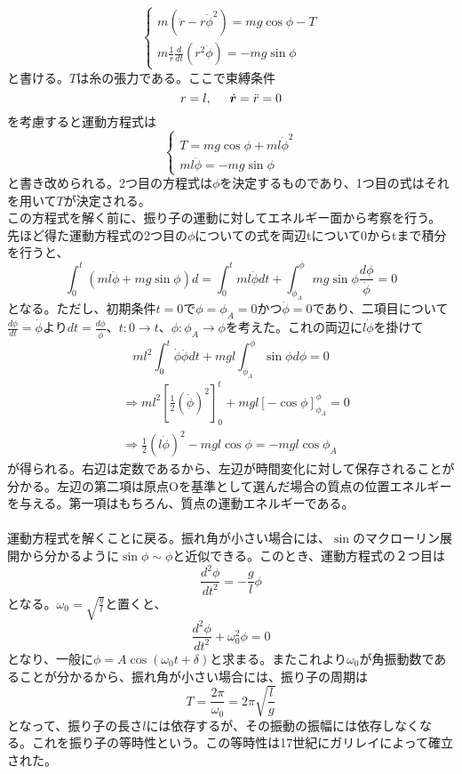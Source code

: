 \documentclass{jsarticle}
\begin{document}
\[\begin{cases}
m(\ddot{r}-r\dot{\phi}^2)=mg\cos\phi-T\\
m\frac{1}{r}\frac{d}{dt}(r^2\dot{\phi})=-mg\sin\phi\end{cases}\]
と書ける。\(T\)は糸の張力である。ここで束縛条件
\[r=l,\hspace{5mm}\dot{\bm{r}}=\ddot{r}=0\]
を考慮すると運動方程式は
\[\begin{cases}
T=mg\cos\phi+ml\dot{\phi}^2\\
ml\ddot{\phi}=-mg\sin\phi\end{cases}\]
と書き改められる。2つ目の方程式は\(\phi\)を決定するものであり、1つ目の式はそれを用いて\(T\)が決定される。\\
この方程式を解く前に、振り子の運動に対してエネルギー面から考察を行う。\\
先ほど得た運動方程式の2つ目の\(\phi\)についての式を両辺tについて0からtまで積分を行うと、
\[\int_{0}^{t}(ml\ddot{\phi}+mg\sin\phi)d=\int_{0}^{t}ml\ddot{\phi}dt+\int_{\phi_{A}}^{\phi}mg\sin\phi\frac{d\phi}{\dot{\phi}}=0\]
となる。ただし、初期条件\(t=0\)で\(\phi=\phi_{A}=0\)かつ\(\dot{\phi}=0\)であり、二項目について\(\frac{d\phi}{dt}=\dot{\phi}\)より\(dt=\frac{d\phi}{\dot{\phi}}\)、\(t:0\to t\)、\(\phi:\phi_{A}\to\phi\)を考えた。これの両辺に\(l\dot{\phi}\)を掛けて
\[ml^{2}\int_{0}^{t}\dot{\phi}\ddot{\phi}dt+mgl\int_{\phi_{A}}^{\phi}\sin\phi d\phi=0\]
\begin{align*}
&\Rightarrow ml^{2}\left[\frac{1}{2}(\dot{\phi})^2\right]_{0}^{t}+mgl\left[-\cos\phi\right]_{\phi_{A}}^{\phi}=0\\
&\Rightarrow\frac{1}{2}(l\dot{\phi})^2 -mgl\cos\phi=-mgl\cos\phi_{A}
\end{align*}
が得られる。右辺は定数であるから、左辺が時間変化に対して保存されることが分かる。左辺の第二項は原点Oを基準として選んだ場合の質点の位置エネルギーを与える。第一項はもちろん、質点の運動エネルギーである。\\
\\
運動方程式を解くことに戻る。振れ角が小さい場合には、\(\sin\)のマクローリン展開から分かるように\(\sin\phi\sim\phi\)と近似できる。このとき、運動方程式の２つ目は
\[\frac{d^2\phi}{dt^2}=-\frac{g}{
l}\phi\]
となる。\(\displaystyle\omega_{0}=\sqrt{\frac{g}{l}}\)と置くと、
\[\frac{d^2\phi}{dt^2}+\omega_{0}^2\phi=0\]
となり、一般に\(\phi=A\cos(\omega_{0}t+\delta)\)と求まる。またこれより\(\omega_{0}\)が角振動数であることが分かるから、振れ角が小さい場合には、振り子の周期は
\[T=\frac{2\pi}{\omega_{0}}=2\pi\sqrt{\frac{l}{g}}\]
となって、振り子の長さ\(l\)には依存するが、その振動の振幅には依存しなくなる。これを振り子の等時性という。この等時性は17世紀にガリレイによって確立された。\\
\end{document}
